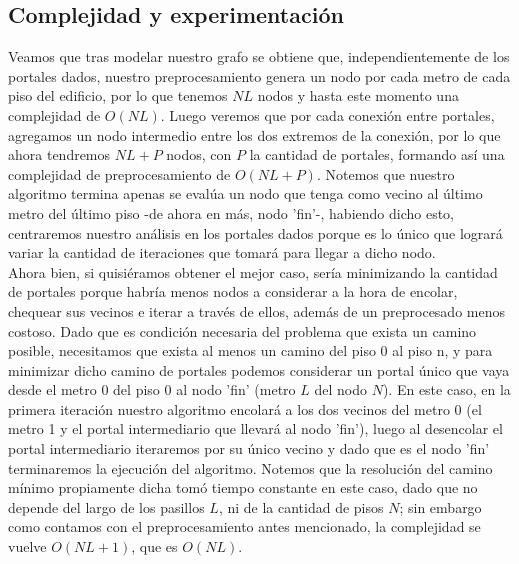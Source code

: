 \documentclass{article}
\theoremstyle{definition}
\theoremstyle{remark}
\begin{document}
\subsection{Complejidad y experimentación}

Veamos que tras modelar nuestro grafo se obtiene que, independientemente de los portales dados, nuestro preprocesamiento genera un nodo por cada metro de cada piso del edificio, por lo que tenemos $NL$ nodos y hasta este momento una complejidad de $O(NL)$. Luego veremos que por cada conexión entre portales, agregamos un nodo intermedio entre los dos extremos de la conexión, por lo que ahora tendremos $NL+P$ nodos, con $P$ la cantidad de portales, formando así una complejidad de preprocesamiento de $O(NL+P)$. Notemos que nuestro algoritmo termina apenas se evalúa un nodo que tenga como vecino al último metro del último piso -de ahora en más, nodo 'fin'-, habiendo dicho esto, centraremos nuestro análisis en los portales dados porque es lo único que logrará variar la cantidad de iteraciones que tomará para llegar a dicho nodo. \\

Ahora bien, si quisiéramos obtener el mejor caso, sería minimizando la cantidad de portales porque habría menos nodos a considerar a la hora de encolar, chequear sus vecinos e iterar a través de ellos, además de un preprocesado menos costoso. Dado que es condición necesaria del problema que exista un camino posible, necesitamos que exista al menos un camino del piso 0 al piso n, y para minimizar dicho camino de portales podemos considerar un portal único que vaya desde el metro 0 del piso 0 al nodo 'fin' (metro $L$ del nodo $N$). En este caso, en la primera iteración nuestro algoritmo encolará a los dos vecinos del metro 0 (el metro 1 y el portal intermediario que llevará al nodo 'fin'), luego al desencolar el portal intermediario iteraremos por su único vecino y dado que es el nodo 'fin' terminaremos la ejecución del algoritmo. Notemos que la resolución del camino mínimo propiamente dicha tomó tiempo constante en este caso, dado que no depende del largo de los pasillos $L$, ni de la cantidad de pisos $N$; sin embargo como contamos con el preprocesamiento antes mencionado, la complejidad se vuelve $O(NL+1)$, que es $O(NL)$. \\
    
\end{document}
